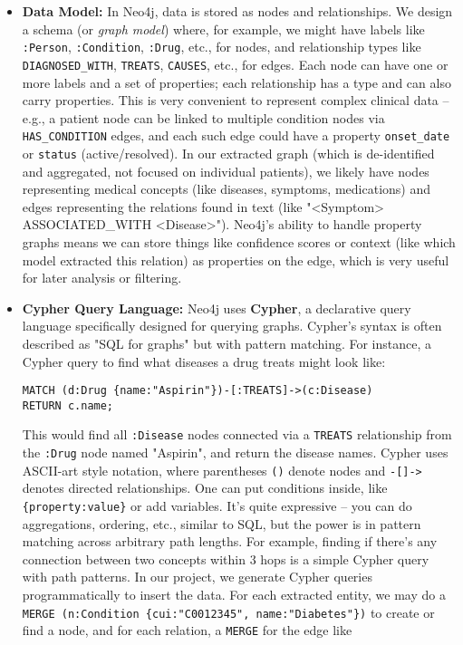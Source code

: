 \begin{itemize}
\item \textbf{Data Model:} In Neo4j, data is stored as nodes and relationships. We design a schema (or \emph{graph model}) where, for example, we might have labels like \texttt{:Person}, \texttt{:Condition}, \texttt{:Drug}, etc., for nodes, and relationship types like \texttt{DIAGNOSED\_WITH}, \texttt{TREATS}, \texttt{CAUSES}, etc., for edges. Each node can have one or more labels and a set of properties; each relationship has a type and can also carry properties. This is very convenient to represent complex clinical data – e.g., a patient node can be linked to multiple condition nodes via \texttt{HAS\_CONDITION} edges, and each such edge could have a property \texttt{onset\_date} or \texttt{status} (active/resolved). In our extracted graph (which is de-identified and aggregated, not focused on individual patients), we likely have nodes representing medical concepts (like diseases, symptoms, medications) and edges representing the relations found in text (like "<Symptom> ASSOCIATED\_WITH <Disease>"). Neo4j's ability to handle property graphs means we can store things like confidence scores or context (like which model extracted this relation) as properties on the edge, which is very useful for later analysis or filtering.

\item \textbf{Cypher Query Language:} Neo4j uses \textbf{Cypher}, a declarative query language specifically designed for querying graphs. Cypher's syntax is often described as "SQL for graphs" but with pattern matching. For instance, a Cypher query to find what diseases a drug treats might look like:

\begin{verbatim}
MATCH (d:Drug {name:"Aspirin"})-[:TREATS]->(c:Disease)
RETURN c.name;
\end{verbatim}

This would find all \texttt{:Disease} nodes connected via a \texttt{TREATS} relationship from the \texttt{:Drug} node named "Aspirin", and return the disease names. Cypher uses ASCII-art style notation, where parentheses \texttt{()} denote nodes and \texttt{-[]->} denotes directed relationships. One can put conditions inside, like \texttt{\{property:value\}} or add variables. It's quite expressive – you can do aggregations, ordering, etc., similar to SQL, but the power is in pattern matching across arbitrary path lengths. For example, finding if there's any connection between two concepts within 3 hops is a simple Cypher query with path patterns. In our project, we generate Cypher queries programmatically to insert the data. For each extracted entity, we may do a \texttt{MERGE (n:Condition \{cui:"C0012345", name:"Diabetes"\})} to create or find a node, and for each relation, a \texttt{MERGE} for the edge like


\end{itemize}
